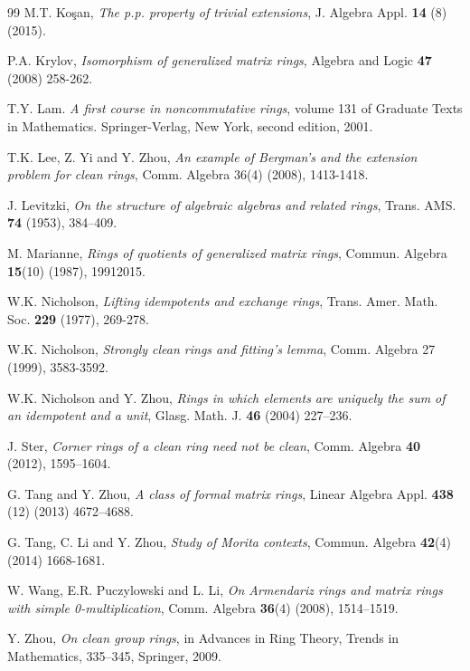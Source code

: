 \documentclass[12pt]{amsart}
\theoremstyle{definition}
\begin{document}
\begin{thebibliography}{99}
M.T. Ko\c{s}an, \textit{The p.p. property of trivial extensions}, J. Algebra Appl. {\bf 14} (8) (2015).

P.A. Krylov, \textit{Isomorphism of generalized matrix rings}, Algebra and Logic {\bf 47} (2008) 258-262.

T.Y. Lam. \textit{A first course in noncommutative rings}, volume 131 of Graduate Texts in Mathematics. Springer-Verlag, New York, second edition, 2001.

 T.K. Lee, Z. Yi and Y. Zhou, \textit{An example of Bergman's and the extension
problem for clean rings}, Comm. Algebra 36(4) (2008), 1413-1418.

 J. Levitzki, \textit{On the structure of algebraic algebras and related rings},  Trans. AMS. {\bf 74} (1953), 384--409.
 
M. Marianne, \textit{Rings of quotients of generalized matrix rings},  Commun. Algebra  {\bf 15}(10) (1987), 19912015.

W.K. Nicholson, \textit{Lifting idempotents and exchange rings},  Trans. Amer. Math. Soc.  {\bf 229} (1977), 269-278.

 W.K. Nicholson, \textit{Strongly clean rings and fitting's lemma},  Comm. Algebra
27 (1999), 3583-3592.

W.K. Nicholson and  Y. Zhou, \textit{Rings in which elements are uniquely the sum of an idempotent and a unit},  Glasg. Math. J.  {\bf 46} (2004) 227--236.

J. Ster, \textit{Corner rings of a clean ring need not be clean},  Comm. Algebra  {\bf 40} (2012), 1595--1604.

G. Tang and  Y. Zhou, \textit{A class of formal matrix rings},  Linear Algebra Appl. {\bf 438} (12) (2013) 4672--4688.

G. Tang, C. Li and  Y. Zhou, \textit{Study of Morita contexts},  Commun. Algebra {\bf 42}(4) (2014) 1668-1681.

W. Wang, E.R. Puczylowski and  L. Li, \textit{On Armendariz rings and matrix rings with simple 0-multiplication},  Comm. Algebra {\bf 36}(4) (2008), 1514--1519.

Y. Zhou, \textit{On clean group rings}, in Advances in Ring Theory,  Trends in Mathematics, 335--345, Springer, 2009.
 
\end{thebibliography}
\end{document}
